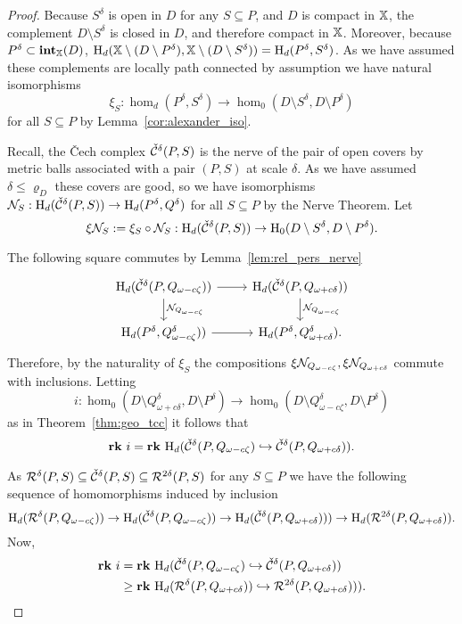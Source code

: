\begin{proof}
  Because $S^\delta$ is open in $D$ for any $S\subseteq P$, and $D$ is compact in $\mathbb{X}$, the complement $D\setminus S^\delta$ is closed in $D$, and therefore compact in $\mathbb{X}$.
  Moreover, because $P^\delta\subset \mathbf{int}_{\mathbb{X}}(D)$, $\mathrm{H}_d(\mathbb{X}\setminus(D\setminus P^\delta), \mathbb{X}\setminus(D\setminus S^\delta)) = \mathrm{H}_d(P^\delta, S^\delta)$.
  As we have assumed these complements are locally path connected by assumption we have natural isomorphisms
  \[\xi_S : \hom_d(P^\delta, S^\delta)\to \hom_0(D\setminus S^\delta, D\setminus P^\delta)\]
  for all $S\subseteq P$ by Lemma~\ref{cor:alexander_iso}.

  Recall, the \v{C}ech complex $\check{\mathcal{C}}^\delta(P, S)$ is the nerve of the pair of open covers by metric balls associated with a pair $(P, S)$ at scale $\delta$.
  As we have assumed $\delta\leq\varrho_D$ these covers are good, so we have isomorphisms $\mathcal{N}_S : \mathrm{H}_d(\check{\mathcal{C}}^\delta(P, S))\to \mathrm{H}_d(P^\delta, Q^\delta)$ for all $S\subseteq P$ by the Nerve Theorem.
  Let
  \[ \xi\mathcal{N}_S := \xi_S\circ\mathcal{N}_S : \mathrm{H}_d(\check{\mathcal{C}}^\delta(P, S))\to \mathrm{H}_0(D\setminus S^\delta, D\setminus P^\delta).\]

  The following square commutes by Lemma~\ref{lem:rel_pers_nerve}
  \[\begin{tikzcd}
    \hom_d(\cech^\delta(P, Q_{\omega-c\zeta})) \arrow{r}\arrow{d}{\N_{Q_{\omega-c\zeta}}} &
    \hom_d(\cech^\delta(P, Q_{\omega+c\delta})) \arrow{d}{\N_{Q_{\omega-c\zeta}}}\\
    \hom_d(P^\delta, Q_{\omega-c\zeta}^\delta))\arrow{r} &
    \hom_d(P^\delta, Q_{\omega+c\delta}^\delta).
  \end{tikzcd}\]
  Therefore, by the naturality of $\xi_{S}$ the compositions $\xi\mathcal{N}_{Q_{\omega-c\zeta}}, \xi\mathcal{N}_{Q_{\omega+c\delta}}$ commute with inclusions.
  Letting
  \[ i : \hom_0(D\setminus Q_{\omega+c\delta}^\delta, D\setminus P^\delta)\to \hom_0(D\setminus Q_{\omega-c\zeta}^\delta, D\setminus P^\delta)\]
  as in Theorem~\ref{thm:geo_tcc} it follows that
  \[ \mathbf{rk}~i = \mathbf{rk}~\mathrm{H}_d(\check{\mathcal{C}}^\delta(P, Q_{\omega-c\zeta})\hookrightarrow \check{\mathcal{C}}^\delta(P,Q_{\omega+c\delta})).\]

  As $\mathcal{R}^\delta(P, S)\subseteq \check{\mathcal{C}}^\delta(P, S)\subseteq \mathcal{R}^{2\delta}(P,S)$ for any $S\subseteq P$ we have the following sequence of homomorphisms induced by inclusion
  \[ \mathrm{H}_d(\mathcal{R}^\delta(P, Q_{\omega-c\zeta}))\to\mathrm{H}_d(\check{\mathcal{C}}^\delta(P, Q_{\omega-c\zeta}))\to\mathrm{H}_d(\check{\mathcal{C}}^\delta(P, Q_{\omega+c\delta})))\to\mathrm{H}_d(\mathcal{R}^{2\delta}(P, Q_{\omega+c\delta})).\]
  Now,
  \begin{align*}
    \mathbf{rk}~i &= \mathbf{rk}~\mathrm{H}_d(\check{\mathcal{C}}^\delta(P, Q_{\omega-c\zeta})\hookrightarrow \check{\mathcal{C}}^\delta(P,Q_{\omega+c\delta}))\\
      &\geq \mathbf{rk}~\mathrm{H}_d(\mathcal{R}^{\delta}(P, Q_{\omega+c\delta}))\hookrightarrow \mathcal{R}^{2\delta}(P, Q_{\omega+c\delta}))).
  \end{align*}


\end{proof}
